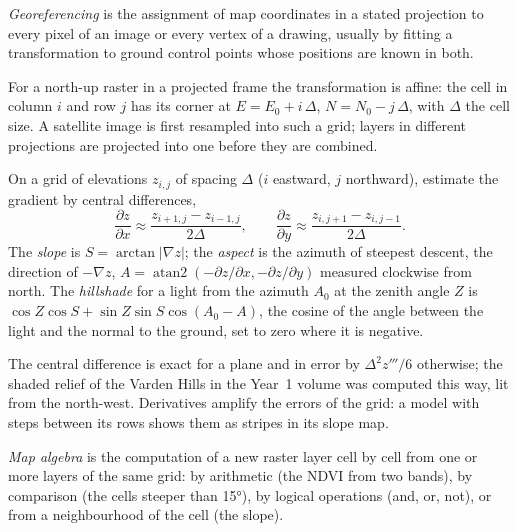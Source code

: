 \begin{definition}[Georeferencing]\label{def:b3:remote-sensing-gis:georef}
\emph{Georeferencing} is the assignment of map
coordinates in a stated projection to every pixel of an image or every
vertex of a drawing, usually by fitting a transformation to ground control
points whose positions are known in both.
\end{definition}

For a north-up raster in a projected frame the transformation is affine:
the cell in column $i$ and row $j$ has its corner at $E = E_0 + i\,\Delta$,
$N = N_0 - j\,\Delta$, with $\Delta$ the cell size. A satellite image is
first resampled into such a grid; layers in different projections are
projected into one before they are combined.

\begin{method}\label{met:b3:remote-sensing-gis:slope}
On a grid of elevations $z_{i,j}$ of spacing $\Delta$ ($i$ eastward, $j$
northward), estimate the gradient by central differences,
\[
\frac{\partial z}{\partial x} \approx \frac{z_{i+1,j} - z_{i-1,j}}{2\Delta} ,
\qquad
\frac{\partial z}{\partial y} \approx \frac{z_{i,j+1} - z_{i,j-1}}{2\Delta} .
\]
The \emph{slope} is $S = \arctan|\nabla z|$; the \emph{aspect} is the
azimuth of steepest descent, the direction of $-\nabla z$, $A =
\operatorname{atan2}(-\partial z/\partial x, -\partial z/\partial y)$
measured clockwise from north. The \emph{hillshade} for a light from the
azimuth $A_0$ at the zenith angle $Z$ is $\cos Z\cos S + \sin Z\sin S
\cos(A_0 - A)$, the cosine of the angle between the light and the normal
to the ground, set to zero where it is negative.
\end{method}

The central difference is exact for a plane and in error by
$\Delta^2 z'''/6$ otherwise; the shaded relief of the Varden Hills in the
Year~1 volume was computed this way, lit from the north-west. Derivatives
amplify the errors of the grid: a model with steps between its rows shows
them as stripes in its slope map.

\begin{definition}\label{def:b3:remote-sensing-gis:map-algebra}
\emph{Map algebra} is the computation of a new raster
layer cell by cell from one or more layers of the same grid: by arithmetic
(the NDVI from two bands), by comparison (the cells steeper than
\ang{15}), by logical operations (and, or, not), or from a neighbourhood
of the cell (the slope).
\end{definition}

